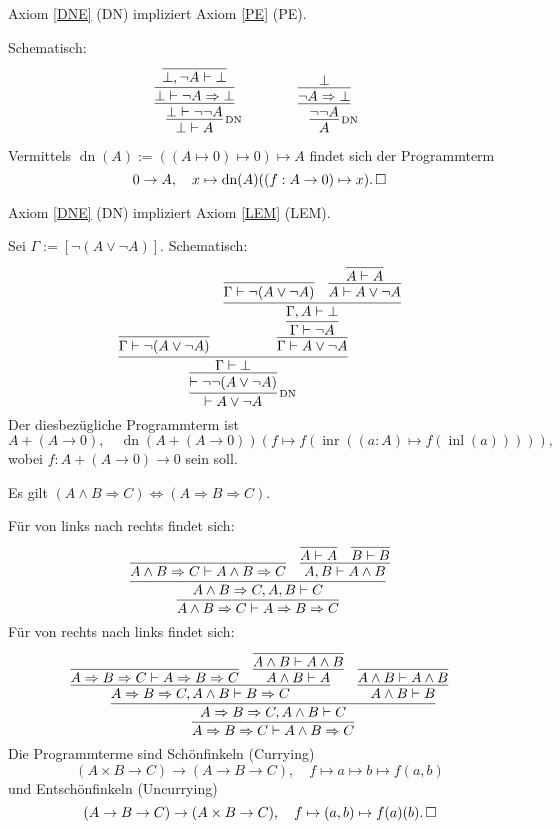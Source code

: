 \begin{Satz}
Axiom \ref{DNE} (DN) impliziert
Axiom \ref{PE} (PE).
\end{Satz}
\begin{Beweis}[Beweis]
Schematisch:
\[
\begin{array}{@{}l@{\qquad\qquad}l}
\infer[\infernote{DN}]{\bot\vdash A}{
  \infer{\bot\vdash\neg\neg A}{
    \infer{\bot\vdash \neg A\Rightarrow\bot}{
      \infer{\bot,\neg A\vdash\bot}{}}}}
&
\infer[\infernote{DN}]{A}{
  \infer{\neg\neg A}{
    \infer{\neg A\Rightarrow\bot}{\bot}}}
\end{array}
\]
Vermittels $\operatorname{dn}(A):=((A\mapsto 0)\mapsto 0)\mapsto A$
findet sich der Programmterm
\[0\to A,\quad x\mapsto \operatorname{dn}(A)((f: A\to 0)\mapsto x).
\,\square\]
\end{Beweis}

\begin{Satz}
Axiom \ref{DNE} (DN) impliziert Axiom \ref{LEM} (LEM).
\end{Satz}
\begin{Beweis}[Beweis]
Sei $\Gamma:=[\neg (A\lor\neg A)]$. Schematisch:
\[\infer[\infernote{DN}]{\vdash A\lor\neg A}{
  \infer{\vdash\neg\neg (A\lor\neg A)}{
    \infer{\Gamma\vdash\bot}{
      \infer{\Gamma\vdash\neg (A\lor\neg A)}{}
    & \infer{\Gamma\vdash A\lor\neg A}{
        \infer{\Gamma\vdash\neg A}{
          \infer{\Gamma,A\vdash\bot}{
            \infer{\Gamma\vdash\neg (A\lor\neg A)}{}
          & \infer{A\vdash A\lor\neg A}{\infer{A\vdash A}{}}}}}}}}
\]
Der diesbezügliche Programmterm ist
\[A + (A\to 0),\quad
\operatorname{dn}(A + (A\to 0))(
  f\mapsto f(\operatorname{inr}((a: A)\mapsto f(\operatorname{inl}(a))))
),\]
wobei $f\colon A + (A \to 0)\to 0$ sein soll.\,\qedsymbol
\end{Beweis}

\begin{Satz}\label{curry-impl}
Es gilt $(A\land B\Rightarrow C)\Leftrightarrow (A\Rightarrow B\Rightarrow C)$.
\end{Satz}
\begin{Beweis}
Für von links nach rechts findet sich:
\[
\infer{A\land B\Rightarrow C\vdash A\Rightarrow B\Rightarrow C}{
  \infer{A\land B\Rightarrow C, A, B\vdash C}{
    \infer{A\land B\Rightarrow C\vdash A\land B\Rightarrow C}{}
  & \infer{A, B\vdash A\land B}{
      \infer{A\vdash A}{} & \infer{B\vdash B}{}}}}
\]
Für von rechts nach links findet sich:
\[
\infer{A\Rightarrow B\Rightarrow C\vdash A\land B\Rightarrow C}{
  \infer{A\Rightarrow B\Rightarrow C, A\land B\vdash C}{
    \infer{A\Rightarrow B\Rightarrow C, A\land B\vdash B\Rightarrow C}{
      \infer{A\Rightarrow B\Rightarrow C\vdash A\Rightarrow B\Rightarrow C}{}
    & \infer{A\land B\vdash A}{\infer{A\land B\vdash A\land B}{}}}
  & \infer{A\land B\vdash B}{\infer{A\land B\vdash A\land B}{}}}}
\]
Die Programmterme sind Schönfinkeln (Currying)
\[(A\times B\to C)\to (A\to B\to C),\quad
f\mapsto a\mapsto b\mapsto f(a,b)\]
und Entschönfinkeln (Uncurrying)
\[(A\to B\to C)\to (A\times B\to C),\quad
f\mapsto (a, b)\mapsto f(a)(b).\,\square\]
\end{Beweis}

